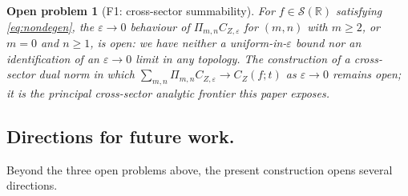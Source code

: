 \documentclass[EJP]{ejpecp}
\newtheorem{openproblem}[theorem]{Open problem}
\newcommand{\R}{\mathbb{R}}
\newcommand{\IBM}{Z}
\newcommand{\Pir}{\Pi}
\begin{document}
\begin{openproblem}[F1: cross-sector summability]\label{flag:summability}
For $f\in\mathscr S(\R)$ satisfying \eqref{eq:nondegen}, the
$\varepsilon\to 0$ behaviour of $\Pir_{m,n}C_{\IBM,\varepsilon}$
for $(m,n)$ with $m\ge 2$, or $m=0$ and $n\ge 1$, is open: we have
neither a uniform-in-$\varepsilon$ bound nor an identification of an
$\varepsilon\to 0$ limit in any topology. The construction of a
cross-sector dual norm in which
$\sum_{m,n}\Pir_{m,n}C_{\IBM,\varepsilon}\to C_\IBM(f;t)$ as
$\varepsilon\to 0$ remains open; it is the principal cross-sector
analytic frontier this paper exposes.
\end{openproblem}

\subsection*{Directions for future work.}

Beyond the three open problems above, the present construction
opens several directions.
\end{document}
